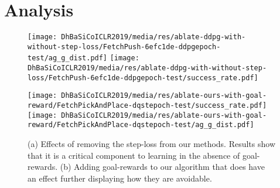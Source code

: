 \section{Analysis}
%
\begin{figure}%
  \def\frac{0.5}
  \begin{minipage}[b]{0.5\linewidth}
    \centering
    \texttt{[image: DhBaSiCoICLR2019/media/res/ablate-ddpg-with-without-step-loss/FetchPush-6efc1de-ddpgepoch-test/ag\_g\_dist.pdf]}%
    \texttt{[image: DhBaSiCoICLR2019/media/res/ablate-ddpg-with-without-step-loss/FetchPush-6efc1de-ddpgepoch-test/success\_rate.pdf]}\\
    \label{fig:with-and-without-step-loss-a}
  \end{minipage}
  \begin{minipage}[b]{0.5\linewidth}
    \centering
    \texttt{[image: DhBaSiCoICLR2019/media/res/ablate-ours-with-goal-reward/FetchPickAndPlace-dqstepoch-test/success\_rate.pdf]}%
    \texttt{[image: DhBaSiCoICLR2019/media/res/ablate-ours-with-goal-reward/FetchPickAndPlace-dqstepoch-test/ag\_g\_dist.pdf]}\\
    \label{fig:with-and-without-step-loss-b}
  \end{minipage}
  \caption{
      (a) Effects of removing the step-loss from our methods. Results
      show that it is a critical component to learning in the absence
      of goal-rewards.  
      (b) Adding goal-rewards to our algorithm that does have an effect
      further displaying how they are avoidable. 
    }
  \label{fig:with-and-without-step-loss}%
\end{figure}%
% 

